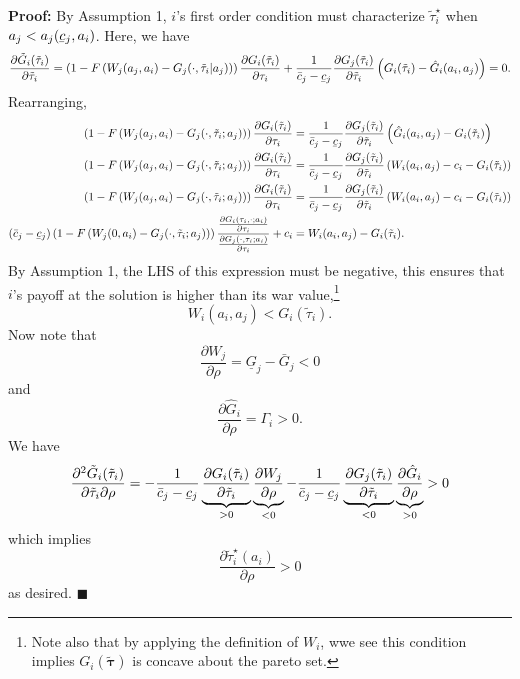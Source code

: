 \documentclass{puthesis}
\DeclareRobustCommand{\ubar}[1]{\underaccent{\bar}{#1}}
\begin{document}
\textbf{Proof:} By Assumption 1, \(i\)'s first order condition must
characterize \(\tilde{\tau}_i^\star\) when
\(a_j < a_j(\ubar{c}_j, a_i)\). Here, we have \[
\frac{\partial \tilde{G}_i(\tilde{\tau}_i)}{\partial \tilde{\tau}_i} = \left( 1 - F \left( W_j(a_j, a_i) - G_j(\cdot, \tilde{\tau}_i | a_j) \right) \right) \frac{\partial G_i(\tilde{\tau}_i)}{\partial \tau_i} + \frac{1}{\bar{c}_j - \ubar{c}_j} \frac{\partial G_j(\tilde{\tau}_i)}{\partial \tilde{\tau}_i} \left( G_i(\tilde{\tau}_i) - \hat{G}_i(a_i, a_j) \right) = 0 .
\] Rearranging, \begin{align*}
\left( 1 - F \left( W_j(a_j, a_i) - G_j(\cdot, \tilde{\tau}_i; a_j) \right) \right) \frac{\partial G_i(\tilde{\tau}_i)}{\partial \tau_i} &= \frac{1}{\bar{c}_j - \ubar{c}_j} \frac{\partial G_j(\tilde{\tau}_i)}{\partial \tilde{\tau}_i} \left( \hat{G}_i(a_i, a_j) - G_i(\tilde{\tau}_i) \right) \\
\left( 1 - F \left( W_j(a_j, a_i) - G_j(\cdot, \tilde{\tau}_i; a_j) \right) \right) \frac{\partial G_i(\tilde{\tau}_i)}{\partial \tau_i} &= \frac{1}{\bar{c}_j - \ubar{c}_j} \frac{\partial G_j(\tilde{\tau}_i)}{\partial \tilde{\tau}_i} \left( W_i(a_i, a_j) - c_i - G_i(\tilde{\tau}_i) \right) \\
\left( 1 - F \left( W_j(a_j, a_i) - G_j(\cdot, \tilde{\tau}_i; a_j) \right) \right) \frac{\partial G_i(\tilde{\tau}_i)}{\partial \tau_i} &= \frac{1}{\bar{c}_j - \ubar{c}_j} \frac{\partial G_j(\tilde{\tau}_i)}{\partial \tilde{\tau}_i} \left( W_i(a_i, a_j) - c_i - G_i(\tilde{\tau}_i) \right) \\
(\bar{c}_j - \ubar{c}_j) \left( 1 - F \left( W_j(0, a_i) - G_j(\cdot, \tilde{\tau}_i; a_j) \right) \right) \frac{ \frac{\partial G_i(\tau_i, \cdot; a_i)}{\partial \tau_i} }{ \frac{\partial G_j(\cdot, \tau_i; a_i)}{\partial \tau_i} } + c_i &= W_i(a_i, a_j) - G_i(\tilde{\tau}_i) .
\end{align*} By Assumption 1, the LHS of this expression must be
negative, this ensures that \(i\)'s payoff at the solution is higher
than its war value,\footnote{Note also that by applying the definition
  of \(W_i\), wwe see this condition implies \(G_i(\tilde{\bm{\tau}})\)
  is concave about the pareto set.} \[
W_i(a_i, a_j) < G_i(\tilde{\tau}_i) .
\] Now note that \[
\frac{\partial W_j}{\partial \rho} = \underline{G}_j - \bar{G}_j < 0
\] and \[
\frac{\partial \hat{G}_i}{\partial \rho} = \Gamma_i > 0 .
\] We have \[
\frac{\partial^2 \tilde{G}_i(\tilde{\tau}_i)}{\partial \tilde{\tau}_i \partial \rho} = - \frac{1}{\bar{c}_j - \ubar{c}_j} \underbrace{\frac{\partial G_i(\tilde{\tau}_i)}{\partial \tilde{\tau}_i}}_{>0} \underbrace{\frac{\partial W_j}{\partial \rho}}_{<0} - \frac{1}{\bar{c}_j - \ubar{c}_j} \underbrace{\frac{\partial G_j(\tilde{\tau}_i)}{\partial \tilde{\tau}_i}}_{<0} \underbrace{\frac{\partial \hat{G}_i}{\partial \rho}}_{>0} > 0
\] which implies \[
\frac{\partial \tilde{\tau}_i^\star(a_i)}{\partial \rho} > 0
\] as desired. \(\blacksquare\)
\end{document}
